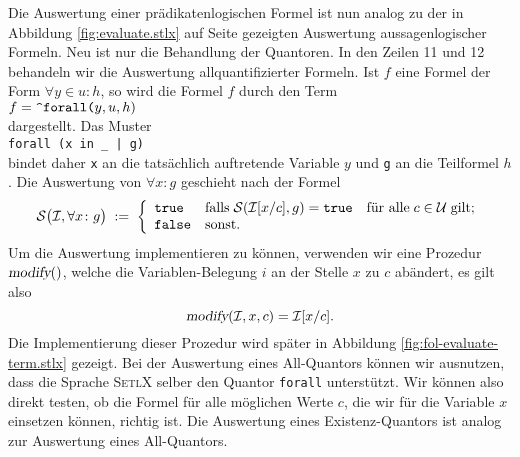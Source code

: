 Die Auswertung einer pr\"{a}dikatenlogischen Formel ist nun analog zu der in Abbildung \ref{fig:evaluate.stlx}
auf Seite \pageref{fig:evaluate.stlx} gezeigten Auswertung aussagenlogischer Formeln.  
Neu ist nur die Behandlung der Quantoren.  In den Zeilen 11 und 12 behandeln wir die Auswertung
allquantifizierter Formeln.  Ist $f$ eine Formel der Form $\forall y \in u \colon h$,
so wird die Formel $f$ durch den Term 
\\[0.2cm]
\hspace*{1.3cm}
$f = \texttt{\symbol{94}forall(}y, u, h\mathtt{)}$
\\[0.2cm]
dargestellt.  Das Muster 
\\[0.2cm]
\hspace*{1.3cm}
\texttt{forall (x in \_ | g)}
\\[0.2cm]
bindet daher \texttt{x} an die tats\"{a}chlich auftretende Variable $y$ und \texttt{g} an die Teilformel $h$.
Die Auswertung von $\forall x\colon g$
geschieht nach der Formel
\[\mathcal{S}\bigl(\mathcal{I}, \forall x\colon g\bigr) \;:=\; \left\{
      \begin{array}{ll}
         \mathtt{true}  & \mbox{falls}\; \mathcal{S}(\mathcal{I}[x/c], g) = \mathtt{true}\quad \mbox{f\"{u}r alle}\; c\in \mathcal{U}\;\mbox{gilt}; \\
         \mathtt{false} & \mbox{sonst}.
      \end{array}
      \right.
\]
Um die Auswertung implementieren zu k\"{o}nnen, verwenden wir eine Prozedur $\textsl{modify}()$, welche die
Variablen-Belegung $i$ an der Stelle $x$ zu $c$ ab\"{a}ndert, es gilt also
\[ \textsl{modify}(\mathcal{I},x,c) = \mathcal{I}[x/c]. \]
Die Implementierung dieser Prozedur wird sp\"{a}ter in Abbildung \ref{fig:fol-evaluate-term.stlx}
gezeigt.  Bei der Auswertung eines All-Quantors k\"{o}nnen wir ausnutzen, dass die Sprache \textsc{SetlX}
selber den Quantor \texttt{forall} unterst\"{u}tzt.  Wir k\"{o}nnen also direkt testen, ob die
Formel f\"{u}r alle m\"{o}glichen Werte $c$, die wir f\"{u}r die Variable $x$ einsetzen k\"{o}nnen,
richtig ist.  Die Auswertung eines Existenz-Quantors ist analog zur Auswertung eines All-Quantors.



